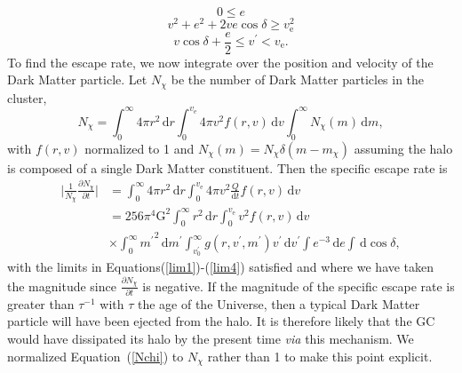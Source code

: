 \documentclass[aps,floatfix,prd,showpacs]{revtex4}
\newcommand{\diff}{\mathrm{d}}
\newcommand{\vesc}{v_{\text{e}}}
\newcommand{\vp}{v^\prime}
\newcommand{\mpr}{m^\prime}
\newcommand{\G}{\text{G}}
\newcommand{\mx}{m_\chi}
\newcommand{\Nx}{N_\chi}
\begin{document}
\begin{equation}
0 \le e
\label{lim2}
\end{equation}
\begin{equation}
v^2 + e^2 + 2ve\cos\delta \ge \vesc^2
\label{lim3}
\end{equation}
\begin{equation}
v\cos\delta + \frac{e}{2} \le \vp < \vesc.
\label{lim4}
\end{equation}
%
%
To find the escape rate, we now integrate over the position and velocity of the Dark Matter particle. Let $\Nx$ be the number of Dark Matter particles in the cluster, 
%
\begin{equation}
\Nx = \int^\infty_0{4\pi r^2}\,\diff r\int^{\vesc}_0{4\pi v^2f(r,v)}\,\diff v\int^\infty_0{\Nx(m)}\,\diff m,
\label{Nchi}
\end{equation}
with $f(r,v)$ normalized to 1 and $\Nx(m) = \Nx\delta(m-\mx)$ assuming the halo is composed of a single Dark Matter constituent. Then the specific escape rate is
%
\begin{equation}
\label{esc1}
\begin{split}
\bigg|\frac{1}{\Nx}\frac{\partial \Nx}{\partial t}\bigg| & = \int^\infty_0{4\pi r^2}\,\diff r\int^{\vesc}_0{4\pi v^2\frac{Q}{\diff t}f(r,v)}\,\diff v \\
& = 256\pi^4\G^2\int^\infty_0{r^2}\,\diff r\int^{\vesc}_0{v^2f(r,v)}\,\diff v \\
& \times \int^\infty_0{\mpr}^2\,\diff \mpr\int^\infty_{\vp_0}{g(r,\vp,\mpr)\vp}\,\diff \vp\int{e^{-3}}\,\diff e\int{}\,\diff\cos\delta,
\end{split}
\end{equation}
%
%
with the limits in Equations(\ref{lim1})-(\ref{lim4}) satisfied and where we have taken the magnitude since $\frac{\partial \Nx}{\partial t}$ is negative. If the magnitude of the specific escape rate is greater than $\tau^{-1}$ with $\tau$ the age of the Universe, then a typical Dark Matter particle will have been ejected from the halo.  It is therefore likely that the GC would have dissipated its halo by the present time {\em via} this mechanism. We normalized Equation~(\ref{Nchi}) to $\Nx$ rather than 1 to make this point explicit. 
\end{document}
